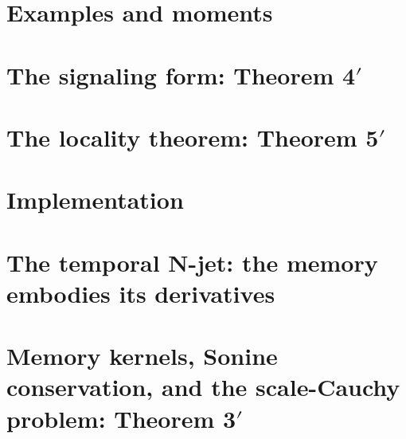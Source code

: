 \chapter{Examples and moments}


\chapter{The signaling form: Theorem 4$'$}


\chapter{The locality theorem: Theorem 5$'$}


\chapter{Implementation}


\chapter{The temporal N-jet: the memory embodies its derivatives}


\appendix

\chapter{Memory kernels, Sonine conservation, and the scale-Cauchy problem: Theorem 3$'$}


